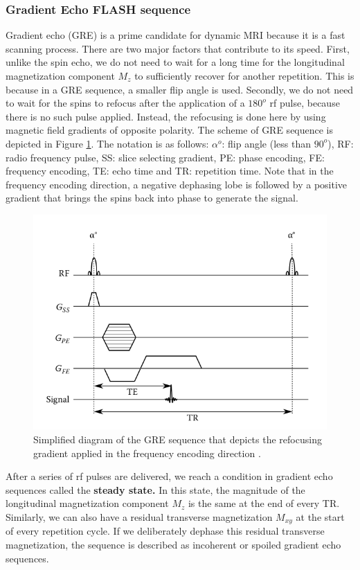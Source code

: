 \documentclass{micro-econ-thesis}
\begin{document}
\subsubsection{Gradient Echo FLASH sequence}

Gradient echo (GRE) is a prime candidate for dynamic MRI because it is a fast scanning process. There are two major factors that contribute to its speed. First, unlike the spin echo, we do not need to wait for a long time for the longitudinal magnetization component $M_z$ to sufficiently recover for another repetition. This is because in a GRE sequence, a smaller flip angle is used. Secondly, we do not need to wait for the spins to refocus after the application of a $180^o$ rf pulse, because there is no such pulse applied. Instead, the refocusing is done here by using magnetic field gradients of opposite polarity. The scheme of GRE sequence is depicted in Figure \ref{fig:gresimplified}. The notation is as follows: $\alpha^o$: flip angle (less than $90^o$), RF: radio frequency pulse, SS: slice selecting gradient, PE: phase encoding, FE: frequency encoding, TE: echo time and TR: repetition time. Note that in the frequency encoding direction, a negative dephasing lobe is followed by a positive gradient that brings the spins back into phase to generate the signal.    
\begin{figure}[H]
	\centering
	\includegraphics[width=0.7\linewidth]{gre_simplified}
	\caption{Simplified diagram of the GRE sequence that depicts the refocusing gradient applied in the frequency encoding direction \parencite[p.233]{berry_fundamentals_2009}.}
	\label{fig:gresimplified}
\end{figure}

After a series of rf pulses are delivered, we reach a condition in gradient echo sequences called the \textbf{steady state.} In this state, the magnitude of the longitudinal magnetization component $M_z$ is the same at the end of every TR. Similarly, we can also have a residual transverse magnetization $M_{xy}$ at the start of every repetition cycle. If we deliberately dephase this residual transverse magnetization, the sequence is described as incoherent or spoiled gradient echo sequences.
\end{document}
